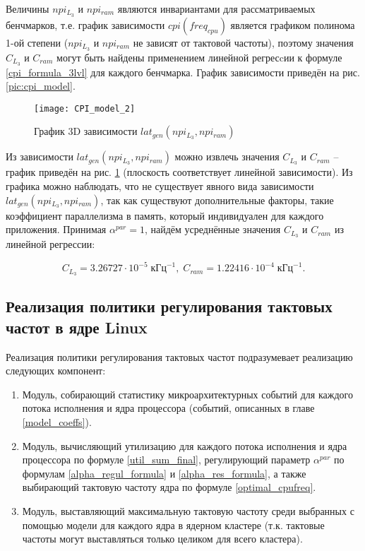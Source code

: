     Величины $npi_{L_3}$ и $npi_{ram}$ являются инвариантами для рассматриваемых бенчмарков, т.е.
    график зависимости $cpi(freq_{cpu})$ является графиком полинома 1-ой степени ($npi_{L_3}$ и
    $npi_{ram}$ не зависят от тактовой частоты), поэтому значения
    $C_{L_3}$ и $C_{ram}$ могут быть найдены
    применением линейной регресcии к формуле \eqref{cpi_formula_3lvl} для каждого бенчмарка.
    График зависимости приведён на рис. \ref{pic:cpi_model}.

    \begin{figure}[!h]
        \caption{График 3D зависимости $lat_{gen}(npi_{L_3}, npi_{ram})$}
        \centering
        \texttt{[image: CPI\_model\_2]}
        \label{pic:cpi_model_2}
    \end{figure}

    Из зависимости $lat_{gen}(npi_{L_3}, npi_{ram})$ можно извлечь значения $C_{L_3}$ и $C_{ram}$ --
    график приведён на рис. \ref{pic:cpi_model_2} (плоскость соответствует линейной
    зависимости). Из графика можно наблюдать, что не существует явного вида зависимости
    $lat_{gen}(npi_{L_3}, npi_{ram})$, так как существуют дополнительные факторы, такие коэффициент
    параллелизма в память, который индивидуален для каждого приложения. Принимая $\alpha^{par} = 1$,
    найдём усреднённые значения $C_{L_3}$ и $C_{ram}$ из линейной регрессии:

    \begin{equation}
        C_{L_3} = 3.26727 \cdot 10^{-5} \; \text{кГц}^{-1}, \; C_{ram} = 1.22416 \cdot 10^{-4} \; \text{кГц}^{-1}.
    \end{equation}

\subsection{Реализация политики регулирования тактовых частот в ядре Linux}

    Реализация политики регулирования тактовых частот подразумевает реализацию следующих компонент:
    \begin{enumerate}
        \item Модуль, собирающий статистику микроархитектурных событий для каждого потока исполнения
        и ядра процессора (событий, описанных в главе \ref{model_coeffs}).
        \item Модуль, вычисляющий утилизацию для каждого потока исполнения и ядра процессора по формуле
        \eqref{util_sum_final}, регулирующий параметр $\alpha^{par}$ по формулам \eqref{alpha_regul_formula}
        и \eqref{alpha_res_formula}, а также выбирающий тактовую частоту ядра по формуле
        \eqref{optimal_cpufreq}.
        \item Модуль, выставляющий максимальную тактовую частоту среди выбранных с помощью модели
        для каждого ядра в ядерном кластере (т.к. тактовые частоты могут выставляться только целиком
        для всего кластера).
    \end{enumerate}

